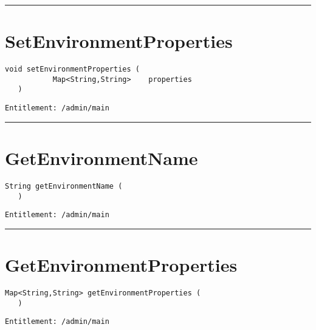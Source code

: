 \rule{12cm}{2pt}
\section{SetEnvironmentProperties}
\label{Api:SetEnvironmentProperties}
\begin{lstlisting}[style=nonumbers]
   void setEnvironmentProperties (
           Map<String,String>    properties
   )
\end{lstlisting}
\begin{Verbatim}[formatcom=\color{Maroon}]
  Entitlement: /admin/main
\end{Verbatim}



\rule{12cm}{2pt}
\section{GetEnvironmentName}
\label{Api:GetEnvironmentName}
\begin{lstlisting}[style=nonumbers]
   String getEnvironmentName (
   )
\end{lstlisting}
\begin{Verbatim}[formatcom=\color{Maroon}]
  Entitlement: /admin/main
\end{Verbatim}



\rule{12cm}{2pt}
\section{GetEnvironmentProperties}
\label{Api:GetEnvironmentProperties}
\begin{lstlisting}[style=nonumbers]
   Map<String,String> getEnvironmentProperties (
   )
\end{lstlisting}
\begin{Verbatim}[formatcom=\color{Maroon}]
  Entitlement: /admin/main
\end{Verbatim}



